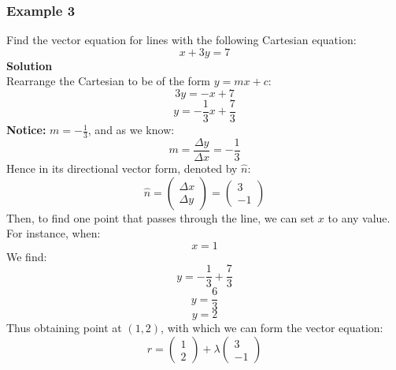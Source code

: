 \documentclass[hidelinks, a4paper, 12pt]{article}
\newcommand{\bd}{\textbf}
\newcommand{\nhat}{\hat{n}}
\begin{document}
            \subsubsection{Example 3}
                Find the vector equation for lines with the following Cartesian equation:
                \[x + 3y = 7\]
                \bd{Solution}\\
                Rearrange the Cartesian to be of the form $y = mx + c$:
                \[3y = -x + 7\]
                \[y = -\frac{1}{3}x + \frac{7}{3}\]
                \bd{Notice: }$m = -\frac{1}{3}$, and as we know:
                \[m = \frac{\Delta y}{ \Delta x} = -\frac{1}{3}\]
                Hence in its directional vector form, denoted by $\nhat$:
                \[\nhat = \begin{pmatrix} \Delta x\\\Delta y \end{pmatrix} = \begin{pmatrix} 3\\-1 \end{pmatrix}\]
                Then, to find one point that passes through the line, we can set $x$ to any value. For instance, when:
                \[x = 1\]
                We find:
                \[y = -\frac{1}{3} + \frac{7}{3} \]
                \[y = \frac{6}{3}\]
                \[y = 2\]
                Thus obtaining point at $(1, 2)$, with which we can form the vector equation:
                \[r = \begin{pmatrix} 1 \\ 2 \end{pmatrix} + \lambda \begin{pmatrix} 3 \\ -1 \end{pmatrix}\]
\end{document}
